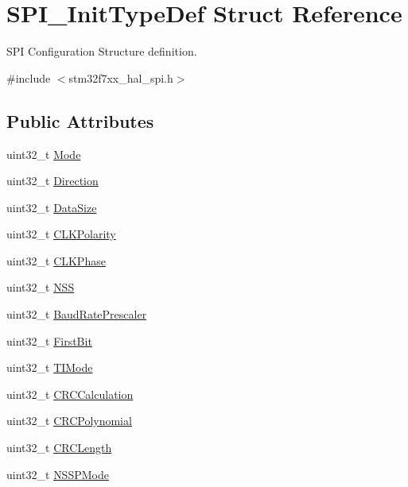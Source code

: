 \hypertarget{struct_s_p_i___init_type_def}{}\section{S\+P\+I\+\_\+\+Init\+Type\+Def Struct Reference}
\label{struct_s_p_i___init_type_def}


S\+PI Configuration Structure definition.  




{\ttfamily \#include $<$stm32f7xx\+\_\+hal\+\_\+spi.\+h$>$}

\subsection*{Public Attributes}
\begin{DoxyCompactItemize}
\item 
uint32\+\_\+t \mbox{\hyperlink{struct_s_p_i___init_type_def_a5247eb0463437c9980a9d4a5300b50a5}{Mode}}
\item 
uint32\+\_\+t \mbox{\hyperlink{struct_s_p_i___init_type_def_ae5c132f597c806d7a1fe316023b36867}{Direction}}
\item 
uint32\+\_\+t \mbox{\hyperlink{struct_s_p_i___init_type_def_a24b7835dd877e1c4e55236303fa3387f}{Data\+Size}}
\item 
uint32\+\_\+t \mbox{\hyperlink{struct_s_p_i___init_type_def_a96922c7ff9e589ebd9611fc4ab730454}{C\+L\+K\+Polarity}}
\item 
uint32\+\_\+t \mbox{\hyperlink{struct_s_p_i___init_type_def_ab21a458209f2588f49a2353c56f62625}{C\+L\+K\+Phase}}
\item 
uint32\+\_\+t \mbox{\hyperlink{struct_s_p_i___init_type_def_aed541d17808213ac6f90ac7deb2bec5f}{N\+SS}}
\item 
uint32\+\_\+t \mbox{\hyperlink{struct_s_p_i___init_type_def_a1d553f90738cb633a9298d2b4d306fde}{Baud\+Rate\+Prescaler}}
\item 
uint32\+\_\+t \mbox{\hyperlink{struct_s_p_i___init_type_def_a8c541d8863cb62a3212b9381b5cba447}{First\+Bit}}
\item 
uint32\+\_\+t \mbox{\hyperlink{struct_s_p_i___init_type_def_a60db7e87bb66775df6213e4006dfd876}{T\+I\+Mode}}
\item 
uint32\+\_\+t \mbox{\hyperlink{struct_s_p_i___init_type_def_a3472de9bd9247c1d97312aff7e58e385}{C\+R\+C\+Calculation}}
\item 
uint32\+\_\+t \mbox{\hyperlink{struct_s_p_i___init_type_def_abdaf3ccbfa4ef68cc81fd32f29baa678}{C\+R\+C\+Polynomial}}
\item 
uint32\+\_\+t \mbox{\hyperlink{struct_s_p_i___init_type_def_ade3815f539adcdeba866ab26a5f59c99}{C\+R\+C\+Length}}
\item 
uint32\+\_\+t \mbox{\hyperlink{struct_s_p_i___init_type_def_aab94c82883ea08f33ef383efe30347eb}{N\+S\+S\+P\+Mode}}
\end{DoxyCompactItemize}


